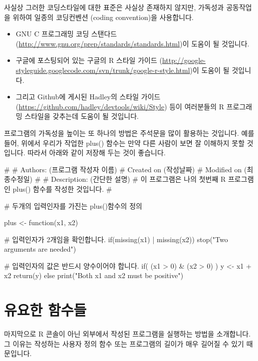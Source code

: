 사실상 그러한 코딩스타일에 대한 표준은 사실상 존재하지 않지만, 가독성과 공동작업을 위하여 일종의 코딩컨벤션 (coding convention)을 사용합니다. 
\begin{itemize}
\item GNU C 프로그래밍 코딩 스탠다드 (\url{http://www.gnu.org/prep/standards/standards.html})이 도움이 될 것입니다. 
\item 구글에 포스팅되어 있는 구글의 R 스타일 가이드 (\url{http://google-styleguide.googlecode.com/svn/trunk/google-r-style.html})이 도움이 될 것입니다. 
\item 그리고 Github에 게시된 Hadley의 스타일 가이드 (\url{https://github.com/hadley/devtools/wiki/Style}) 등이 여러분들의 R 프로그래밍 스타일을 갖추는데 도움이 될 것입니다. 
\end{itemize}

프로그램의 가독성을 높이는 또 하나의 방법은 주석문을 많이 활용하는 것입니다.
예를들어, 위에서 우리가 작업한 plus() 함수는 만약 다른 사람이 보면 잘 이해하지 못할 것입니다. 
따라서 아래와 같이 저장해 두는 것이 좋습니다.

\begin{Schunk}
\begin{Soutput}
# 
# Authors: (프로그램 작성자 이름)
# Created on (작성날짜) 
# Modified on (최종수정일)
# 
# Description: (간단한 설명)
# 이 프로그램은 나의 첫번째 R 프로그램인 plus() 함수를 작성한 것입니다.
# 

# 두개의 입력인자를 가진는 plus()함수의 정의 

plus <- function(x1, x2){

	# 입력인자가 2개임을 확인합니다.
	if(missing(x1) | missing(x2)) stop("Two arguments are needed")
	
	# 입력인자의 값은 반드시 양수이어야 합니다. 
	if( (x1 > 0) & (x2 > 0) ){
		y <- x1 + x2
		return(y)
	}
	else print("Both x1 and x2 must be positive")
}
\end{Soutput}
\end{Schunk}



\section{유요한 함수들} 

마지막으로 R 콘솔이 아닌 외부에서 작성된 프로그램을 실행하는 방법을 소개합니다. 
그 이유는 작성하는 사용자 정의 함수 또는 프로그램의 길이가 매우 길어질 수 있기 때문입니다. 

